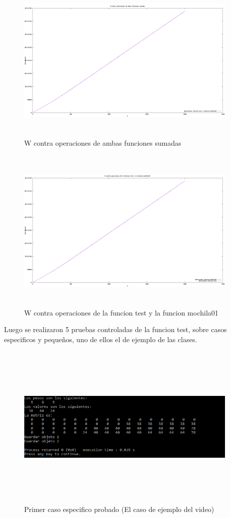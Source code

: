 \documentclass[spanish]{article}
\begin{document}
	 	\begin{figure}[H]
	 		\centering
	 		\includegraphics[width=400px,height=300px]{grafica10}
	 		\caption{W contra operaciones de ambas funciones sumadas}
	 	\end{figure}
	 	\begin{figure}[H]
	 		\centering
	 		\includegraphics[width=400px,height=300px]{grafica11}
	 		\caption{W contra operaciones de la funcion test y la funcion mochila01}
	 	\end{figure}
 		Luego se realizaron 5 pruebas controladas de la funcion test, sobre casos especificos y pequeños, uno de ellos el de ejemplo de las clases.\\
 		\begin{figure}[H]
 			\centering
 			\includegraphics[width=400px,height=300px]{casoEspecifico1}
 			\caption{Primer caso especifico probado (El caso de ejemplo del video)}
 		\end{figure}
\end{document}
